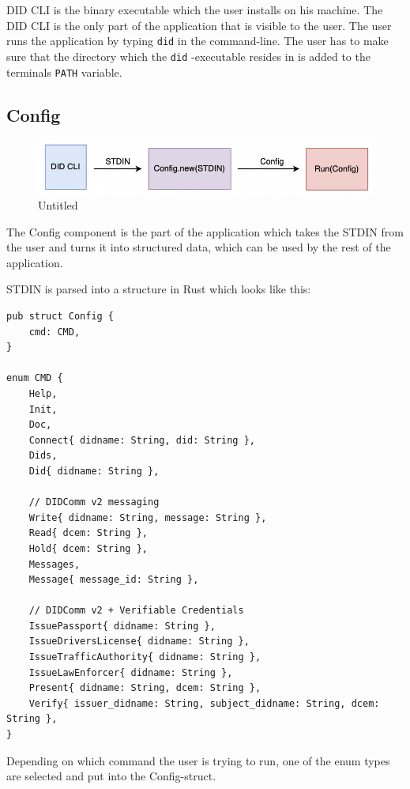 DID CLI is the binary executable which the user installs on his machine.
The DID CLI is the only part of the application that is visible to the
user. The user runs the application by typing
\passthrough{\lstinline!did!} in the command-line. The user has to make
sure that the directory which the \passthrough{\lstinline!did!}
-executable resides in is added to the terminals
\passthrough{\lstinline!PATH!} variable.

\hypertarget{config}{%
\subsection{Config}\label{config}}

\begin{figure}
\centering
\includegraphics{Architecture 1442df162dbe45f4a423ba37d3e12363/Untitled 2.png}
\caption{Untitled}
\end{figure}

The Config component is the part of the application which takes the
STDIN from the user and turns it into structured data, which can be used
by the rest of the application.

STDIN is parsed into a structure in Rust which looks like this:

\begin{lstlisting}
pub struct Config {
    cmd: CMD,
}

enum CMD {
    Help,
    Init,
    Doc,
    Connect{ didname: String, did: String },
    Dids,
    Did{ didname: String },

    // DIDComm v2 messaging
    Write{ didname: String, message: String },
    Read{ dcem: String },
    Hold{ dcem: String },
    Messages,
    Message{ message_id: String },

    // DIDComm v2 + Verifiable Credentials
    IssuePassport{ didname: String },
    IssueDriversLicense{ didname: String },
    IssueTrafficAuthority{ didname: String },
    IssueLawEnforcer{ didname: String },
    Present{ didname: String, dcem: String },
    Verify{ issuer_didname: String, subject_didname: String, dcem: String },
}
\end{lstlisting}

Depending on which command the user is trying to run, one of the enum
types are selected and put into the Config-struct.

